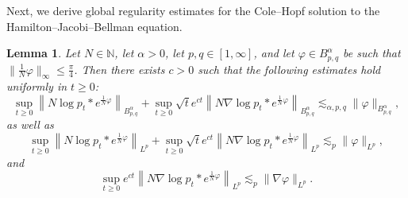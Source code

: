\documentclass[a4paper,12pt]{article}
\newtheorem{lemma}[theorem]{Lemma}
\newcommand{\N}{\mathbb{N}}
\begin{document}
Next, we derive global regularity estimates for the Cole--Hopf solution to the Hamilton--Jacobi--Bellman equation.

\begin{lemma}\label{lem:CH-regularity}
    Let $N \in \N$, let $\alpha> 0$, let $p,q \in [1,\infty]$, and let $\varphi \in B^\alpha_{p,q}$ be such that $\|\tfrac1N\varphi\|_\infty \leq \tfrac{\pi}{4}$. Then there exists $c>0$ such that the following estimates hold uniformly in $t\geq 0$:
    \begin{equation}\label{eq:CH-Besov}
        \sup_{t \geq 0} \left\|N \log p_t \ast e^{\tfrac1N\varphi}\right\|_{B^\alpha_{p,q}} + \sup_{t \geq 0} \sqrt{t} e^{ct} \left\|N \nabla \log p_t \ast e^{\tfrac1N\varphi}\right\|_{B^{\alpha}_{p,q}} \lesssim_{\alpha,p,q} \|\varphi\|_{B^\alpha_{p,q}},
    \end{equation}
    as well as
    \begin{equation}\label{eq:CH-Lebesgue}
         \sup_{t \geq 0} \left\|N \log p_t \ast e^{\tfrac1N\varphi}\right\|_{L^p} + \sup_{t \geq 0} \sqrt{t} e^{ct} \left\| N \nabla \log p_t \ast e^{\tfrac1N\varphi}\right\|_{L^p}\lesssim_p \|\varphi\|_{L^p},
    \end{equation}
    and
    \begin{equation}\label{eq:CH-Lebesgue-gradient}
         \sup_{t \geq 0} e^{ct} \left\| N \nabla \log p_t \ast e^{\tfrac1N\varphi}\right\|_{L^p} \lesssim_p \|\nabla \varphi\|_{L^p}.
    \end{equation}
\end{lemma}
\end{document}
